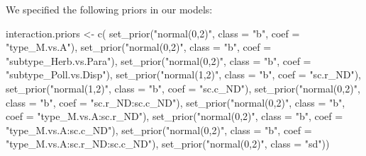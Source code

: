 \documentclass[11pt,]{article}
\newenvironment{Shaded}{}{}
\newcommand{\KeywordTok}[1]{\textcolor[rgb]{0.00,0.00,1.00}{#1}}
\newcommand{\DataTypeTok}[1]{#1}
\newcommand{\StringTok}[1]{\textcolor[rgb]{0.00,0.50,0.50}{#1}}
\newcommand{\NormalTok}[1]{#1}
\begin{document}
We specified the following priors in our models:

\begin{Shaded}
\begin{Highlighting}[]
\NormalTok{interaction.priors <-}\StringTok{ }\KeywordTok{c}\NormalTok{(}
  \KeywordTok{set_prior}\NormalTok{(}\StringTok{"normal(0,2)"}\NormalTok{, }\DataTypeTok{class =} \StringTok{"b"}\NormalTok{, }\DataTypeTok{coef =} \StringTok{"type_M.vs.A"}\NormalTok{),}
  \KeywordTok{set_prior}\NormalTok{(}\StringTok{"normal(0,2)"}\NormalTok{, }\DataTypeTok{class =} \StringTok{"b"}\NormalTok{, }\DataTypeTok{coef =} \StringTok{"subtype_Herb.vs.Para"}\NormalTok{),}
  \KeywordTok{set_prior}\NormalTok{(}\StringTok{"normal(0,2)"}\NormalTok{, }\DataTypeTok{class =} \StringTok{"b"}\NormalTok{, }\DataTypeTok{coef =} \StringTok{"subtype_Poll.vs.Disp"}\NormalTok{),}
  \KeywordTok{set_prior}\NormalTok{(}\StringTok{"normal(1,2)"}\NormalTok{, }\DataTypeTok{class =} \StringTok{"b"}\NormalTok{, }\DataTypeTok{coef =} \StringTok{"sc.r_ND"}\NormalTok{),}
  \KeywordTok{set_prior}\NormalTok{(}\StringTok{"normal(1,2)"}\NormalTok{, }\DataTypeTok{class =} \StringTok{"b"}\NormalTok{, }\DataTypeTok{coef =} \StringTok{"sc.c_ND"}\NormalTok{),}
  \KeywordTok{set_prior}\NormalTok{(}\StringTok{"normal(0,2)"}\NormalTok{, }\DataTypeTok{class =} \StringTok{"b"}\NormalTok{, }\DataTypeTok{coef =} \StringTok{"sc.r_ND:sc.c_ND"}\NormalTok{),}
  \KeywordTok{set_prior}\NormalTok{(}\StringTok{"normal(0,2)"}\NormalTok{, }\DataTypeTok{class =} \StringTok{"b"}\NormalTok{, }\DataTypeTok{coef =} \StringTok{"type_M.vs.A:sc.r_ND"}\NormalTok{),}
  \KeywordTok{set_prior}\NormalTok{(}\StringTok{"normal(0,2)"}\NormalTok{, }\DataTypeTok{class =} \StringTok{"b"}\NormalTok{, }\DataTypeTok{coef =} \StringTok{"type_M.vs.A:sc.c_ND"}\NormalTok{),}
  \KeywordTok{set_prior}\NormalTok{(}\StringTok{"normal(0,2)"}\NormalTok{, }\DataTypeTok{class =} \StringTok{"b"}\NormalTok{, }\DataTypeTok{coef =} \StringTok{"type_M.vs.A:sc.r_ND:sc.c_ND"}\NormalTok{),}
  \KeywordTok{set_prior}\NormalTok{(}\StringTok{"normal(0,2)"}\NormalTok{, }\DataTypeTok{class =} \StringTok{"sd"}\NormalTok{))}


\end{Highlighting}
\end{Shaded}
\end{document}
